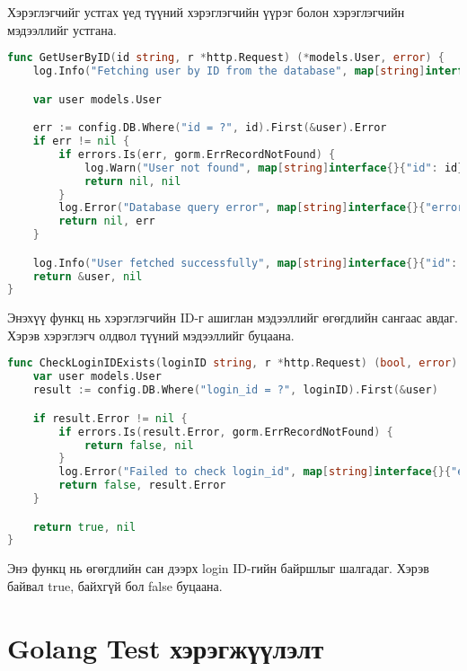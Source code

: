 Хэрэглэгчийг устгах үед түүний хэрэглэгчийн үүрэг болон хэрэглэгчийн мэдээллийг устгана.

\begin{lstlisting}[language=Go, caption=Get user by ID function, frame=single]
func GetUserByID(id string, r *http.Request) (*models.User, error) {
	log.Info("Fetching user by ID from the database", map[string]interface{}{"id": id}, r)

	var user models.User

	err := config.DB.Where("id = ?", id).First(&user).Error
	if err != nil {
		if errors.Is(err, gorm.ErrRecordNotFound) {
			log.Warn("User not found", map[string]interface{}{"id": id}, r)
			return nil, nil
		}
		log.Error("Database query error", map[string]interface{}{"error": err.Error()}, r)
		return nil, err
	}

	log.Info("User fetched successfully", map[string]interface{}{"id": id}, r)
	return &user, nil
}
\end{lstlisting}

Энэхүү функц нь хэрэглэгчийн ID-г ашиглан мэдээллийг өгөгдлийн сангаас авдаг. Хэрэв хэрэглэгч олдвол түүний мэдээллийг буцаана.

\begin{lstlisting}[language=Go, caption=Check if login ID exists function, frame=single]
func CheckLoginIDExists(loginID string, r *http.Request) (bool, error) {
	var user models.User
	result := config.DB.Where("login_id = ?", loginID).First(&user)

	if result.Error != nil {
		if errors.Is(result.Error, gorm.ErrRecordNotFound) {
			return false, nil
		}
		log.Error("Failed to check login_id", map[string]interface{}{"error": result.Error.Error()}, r)
		return false, result.Error 
	}

	return true, nil 
}
\end{lstlisting}

Энэ функц нь өгөгдлийн сан дээрх login ID-гийн байршлыг шалгадаг. Хэрэв байвал true, байхгүй бол false буцаана.
\pagebreak



\section{Golang Test хэрэгжүүлэлт}

